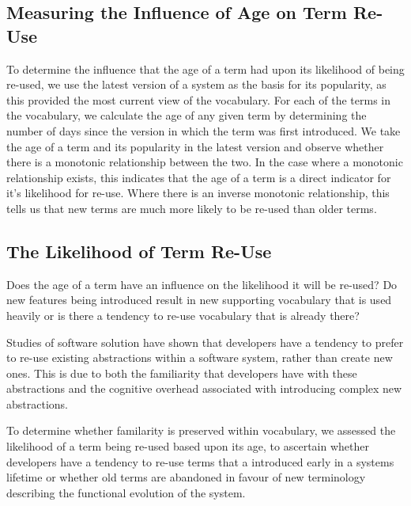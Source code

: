 \subsection{Measuring the Influence of Age on Term Re-Use} %
\label{sub:measuring_the_influence_of_age_on_term_re_use}

To determine the influence that the age of a term had upon its likelihood of being re-used, we use the latest version of a system as the basis for its popularity, as this provided the most current view of the vocabulary. For each of the terms in the vocabulary, we calculate the age of any given term by determining the number of days since the version in which the term was first introduced. We take the age of a term and its popularity in the latest version and observe whether there is a monotonic relationship between the two. In the case where a monotonic relationship exists, this indicates that the age of a term is a direct indicator for it's likelihood for re-use. Where there is an inverse monotonic relationship, this tells us that new terms are much more likely to be re-used than older terms.


\subsection{The Likelihood of Term Re-Use} %
\label{sub:the_likelihood_of_term_re_use}

Does the age of a term have an influence on the likelihood it will be re-used? Do new features being introduced result in new supporting vocabulary that is used heavily or is there a tendency to re-use vocabulary that is already there?

Studies of software solution have shown that developers have a tendency to prefer to re-use existing abstractions within a software system, rather than create new ones. This is due to both the familiarity that developers have with these abstractions and the cognitive overhead associated with introducing complex new abstractions.

To determine whether familarity is preserved within vocabulary, we assessed the likelihood of a term being re-used based upon its age, to ascertain whether developers have a tendency to re-use terms that a introduced early in a systems lifetime or whether old terms are abandoned in favour of new terminology describing the functional evolution of the system.

